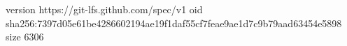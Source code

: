version https://git-lfs.github.com/spec/v1
oid sha256:7397d05e61be4286602194ae19f1daf55cf7feae9ae1d7c9b79aad63454e5898
size 6306
